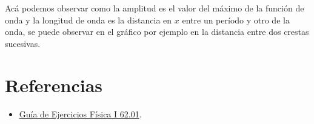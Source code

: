 \documentclass[spanish] {article}
\begin{document}
Acá podemos observar como la amplitud es el valor del máximo de la función de onda y la longitud de onda es la distancia en $x$ entre un período y otro de la onda, se puede observar en el gráfico por ejemplo en la distancia entre dos crestas sucesivas.

\section{Referencias}

\begin{itemize}
  \item \href{http://wiki.foros-fiuba.com.ar/_media/materias:62:guia_fisica_i_62.01.pdf}{Guía de Ejercicios Física I 62.01}.
\end{itemize}
\end{document}
